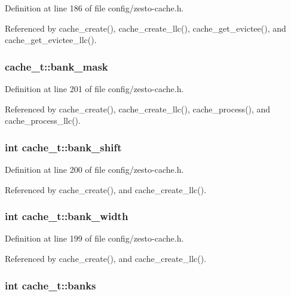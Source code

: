 Definition at line 186 of file config/zesto-cache.h.

Referenced by cache\_\-create(), cache\_\-create\_\-llc(), cache\_\-get\_\-evictee(), and cache\_\-get\_\-evictee\_\-llc().
\subsubsection[{bank\_\-mask}]{ {\bf cache\_\-t::bank\_\-mask}}\label{structcache__t_cd19d427185e24d8edb1045f93e542fa}




Definition at line 201 of file config/zesto-cache.h.

Referenced by cache\_\-create(), cache\_\-create\_\-llc(), cache\_\-process(), and cache\_\-process\_\-llc().
\subsubsection[{bank\_\-shift}]{\setlength{\rightskip}{0pt plus 5cm}int {\bf cache\_\-t::bank\_\-shift}}\label{structcache__t_60ba00647c4b6bfbccdff12c0c830967}




Definition at line 200 of file config/zesto-cache.h.

Referenced by cache\_\-create(), and cache\_\-create\_\-llc().
\subsubsection[{bank\_\-width}]{\setlength{\rightskip}{0pt plus 5cm}int {\bf cache\_\-t::bank\_\-width}}\label{structcache__t_bbb77a639f8cdede28f7aadb6a9b1b05}




Definition at line 199 of file config/zesto-cache.h.

Referenced by cache\_\-create(), and cache\_\-create\_\-llc().
\subsubsection[{banks}]{\setlength{\rightskip}{0pt plus 5cm}int {\bf cache\_\-t::banks}}\label{structcache__t_37f77da1dce76bae522ca6dc39178fc3}




